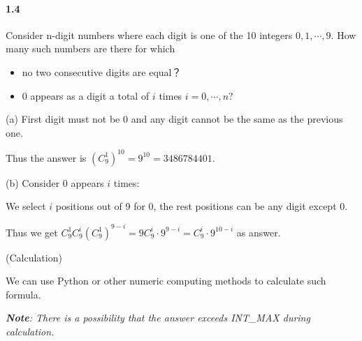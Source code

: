 \paragraph{1.4}
Consider n-digit numbers where each digit is one of the 10 integers $0, 1, \cdots ,9$. How many such numbers are there for which
\begin{itemize}
    \item[(a)] no two consecutive digits are equal？
    \item[(b)] 0 appears as a digit a total of $i$ times $i = 0,\cdots ,n?$
\end{itemize}

\begin{solution}

(a) First digit must not be 0 and any digit cannot be the same as the previous one.

Thus the answer is ${(C_9^1)}^{10} = 9^{10} = 3486784401$.

(b) Consider 0 appears $i$ times:

We select $i$ positions out of 9 for 0, the rest positions can be any digit except 0.

Thus we get $C_9^1 C_9^i (C_{9}^{1})^{9-i} = 9 C_9^i \cdot 9^{9-i} = C_9^i \cdot 9^{10-i}$ as answer.

(Calculation)

We can use Python or other numeric computing methods to calculate such formula.

\textit{\textbf{Note}: There is a possibility that the answer exceeds INT\_MAX during calculation.}

\end{solution}

\begin{table}[hb]
    \centering
\end{table}

